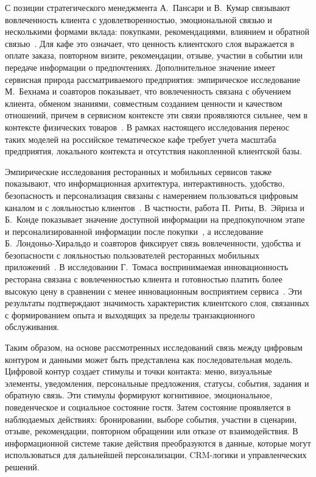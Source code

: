 С позиции стратегического менеджмента А.~Пансари и В.~Кумар связывают вовлеченность клиента с удовлетворенностью, эмоциональной связью и несколькими формами вклада: покупками, рекомендациями, влиянием и обратной связью~\cite{pansari2017}. Для кафе это означает, что ценность клиентского слоя выражается в оплате заказа, повторном визите, рекомендации, отзыве, участии в событии или передаче информации о предпочтениях. Дополнительное значение имеет сервисная природа рассматриваемого предприятия: эмпирическое исследование М.~Бехнама и соавторов показывает, что вовлеченность связана с обучением клиента, обменом знаниями, совместным созданием ценности и качеством отношений, причем в сервисном контексте эти связи проявляются сильнее, чем в контексте физических товаров~\cite{behnam2021}. В рамках настоящего исследования перенос таких моделей на российское тематическое кафе требует учета масштаба предприятия, локального контекста и отсутствия накопленной клиентской базы.

Эмпирические исследования ресторанных и мобильных сервисов также показывают, что информационная архитектура, интерактивность, удобство, безопасность и персонализация связаны с намерением пользоваться цифровым каналом и с лояльностью клиентов~\cite{rita2022, londono2024}. В частности, работа П.~Риты, В.~Эйриза и Б.~Конде показывает значение доступной информации на предпокупочном этапе и персонализированной информации после покупки~\cite{rita2022}, а исследование Б.~Лондоньо-Хиральдо и соавторов фиксирует связь вовлеченности, удобства и безопасности с лояльностью пользователей ресторанных мобильных приложений~\cite{londono2024}. В исследовании Г.~Томаса воспринимаемая инновационность ресторана связана с вовлеченностью клиента и готовностью платить более высокую цену в сравнении с менее инновационным восприятием сервиса~\cite{thomas2023}. Эти результаты подтверждают значимость характеристик клиентского слоя, связанных с формированием опыта и выходящих за пределы транзакционного обслуживания.

Таким образом, на основе рассмотренных исследований связь между цифровым контуром и данными может быть представлена как последовательная модель. Цифровой контур создает стимулы и точки контакта: меню, визуальные элементы, уведомления, персональные предложения, статусы, события, задания и обратную связь. Эти стимулы формируют когнитивное, эмоциональное, поведенческое и социальное состояние гостя. Затем состояние проявляется в наблюдаемых действиях: бронировании, выборе события, участии в сценарии, отзыве, рекомендации, повторном обращении или отказе от взаимодействия. В информационной системе такие действия преобразуются в данные, которые могут использоваться для дальнейшей персонализации, CRM-логики и управленческих решений.

